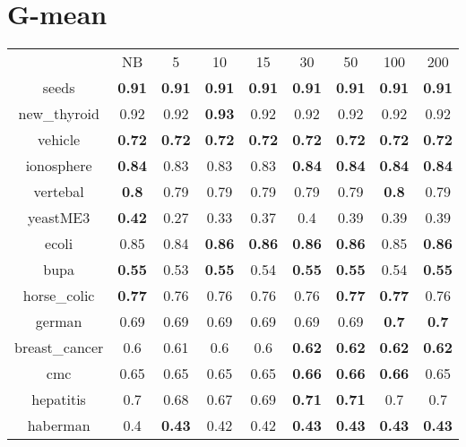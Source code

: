 \documentclass{article}%
\begin{document}
\section*{G{-}mean}%
\begin{tabular}{c|cccccccc}%

&NB&5&10&15&30&50&100&200\\%

seeds&\textbf{0.91}&\textbf{0.91}&\textbf{0.91}&\textbf{0.91}&\textbf{0.91}&\textbf{0.91}&\textbf{0.91}&\textbf{0.91}\\%

new\_thyroid&0.92&0.92&\textbf{0.93}&0.92&0.92&0.92&0.92&0.92\\%

vehicle&\textbf{0.72}&\textbf{0.72}&\textbf{0.72}&\textbf{0.72}&\textbf{0.72}&\textbf{0.72}&\textbf{0.72}&\textbf{0.72}\\%

ionosphere&\textbf{0.84}&0.83&0.83&0.83&\textbf{0.84}&\textbf{0.84}&\textbf{0.84}&\textbf{0.84}\\%

vertebal&\textbf{0.8}&0.79&0.79&0.79&0.79&0.79&\textbf{0.8}&0.79\\%

yeastME3&\textbf{0.42}&0.27&0.33&0.37&0.4&0.39&0.39&0.39\\%

ecoli&0.85&0.84&\textbf{0.86}&\textbf{0.86}&\textbf{0.86}&\textbf{0.86}&0.85&\textbf{0.86}\\%

bupa&\textbf{0.55}&0.53&\textbf{0.55}&0.54&\textbf{0.55}&\textbf{0.55}&0.54&\textbf{0.55}\\%

horse\_colic&\textbf{0.77}&0.76&0.76&0.76&0.76&\textbf{0.77}&\textbf{0.77}&0.76\\%

german&0.69&0.69&0.69&0.69&0.69&0.69&\textbf{0.7}&\textbf{0.7}\\%

breast\_cancer&0.6&0.61&0.6&0.6&\textbf{0.62}&\textbf{0.62}&\textbf{0.62}&\textbf{0.62}\\%

cmc&0.65&0.65&0.65&0.65&\textbf{0.66}&\textbf{0.66}&\textbf{0.66}&0.65\\%

hepatitis&0.7&0.68&0.67&0.69&\textbf{0.71}&\textbf{0.71}&0.7&0.7\\%

haberman&0.4&\textbf{0.43}&0.42&0.42&\textbf{0.43}&\textbf{0.43}&\textbf{0.43}&\textbf{0.43}\\%


\end{tabular}
\end{document}
